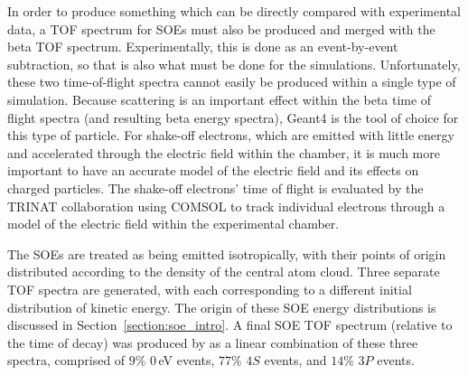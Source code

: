 %
In order to produce something which can be directly compared with experimental data, a TOF spectrum for SOEs must also be produced and merged with the beta TOF spectrum.  Experimentally, this is done as an event-by-event subtraction, so that is also what must be done for the simulations.  Unfortunately, these two time-of-flight spectra cannot easily be produced within a single type of simulation.  Because scattering is an important effect within the beta time of flight spectra (and resulting beta energy spectra), Geant4 is the tool of choice for this type of particle.  For shake-off electrons, which are emitted with little energy and accelerated through the electric field within the chamber, it is much more important to have an accurate model of the electric field and its effects on charged particles.  The shake-off electrons' time of flight is evaluated by the TRINAT collaboration using COMSOL to track individual electrons through a model of the electric field within the experimental chamber.  

The SOEs are treated as being emitted isotropically, with their points of origin distributed according to the density of the central atom cloud.  Three separate TOF spectra are generated, with each corresponding to a different initial distribution of kinetic energy.  The origin of these SOE energy distributions is discussed in Section~\ref{section:soe_intro}.  A final SOE TOF spectrum (relative to the time of decay) was produced by as a linear combination of these three spectra, comprised of $9\%$ 0\,eV events, $77\%$ $4S$ events, and $14\%$ $3P$ events.

